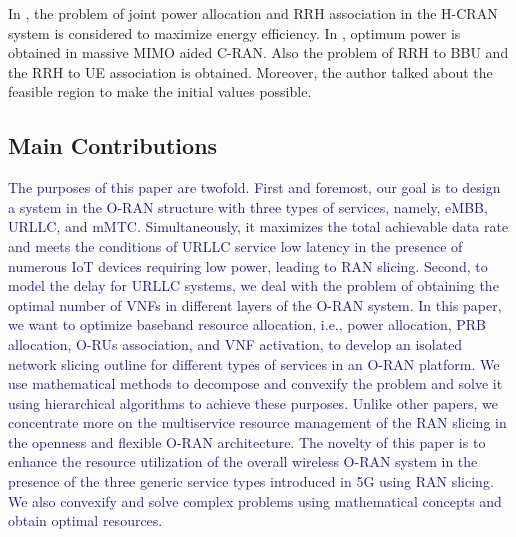 \documentclass[lettersize,journal]{IEEEtran}
\begin{document}
In \cite{ali2019energy,ali2019energy1,ali2018joint}, the problem of joint power allocation and RRH association in the H-CRAN system is considered to maximize energy efficiency.
In \cite{amani2019power}, optimum power is obtained in massive MIMO aided C-RAN. Also the problem of RRH to BBU and the RRH to UE association is obtained. Moreover, the author talked about the feasible region to make the initial values possible.
\subsection{Main Contributions}
\textcolor{MidnightBlue}{The purposes of this paper are twofold. First and foremost, our goal is to design a system in the O-RAN structure with three types of services, namely, eMBB, URLLC, and mMTC. Simultaneously, it maximizes the total achievable data rate and meets the conditions of URLLC service low latency in the presence of numerous IoT devices requiring low power, leading to RAN slicing. Second, to model the delay for URLLC systems, we deal with the problem of obtaining the optimal number of VNFs in different layers of the O-RAN system. 
In this paper, we want to optimize baseband resource allocation, i.e., power allocation, PRB allocation, O-RUs association, and VNF activation, to develop an isolated network slicing outline for different types of services in an O-RAN platform. 
We use mathematical methods to decompose and convexify the problem and solve it using hierarchical algorithms to achieve these purposes.
Unlike other papers, we concentrate more on the multiservice resource management of the RAN slicing in the openness and flexible O-RAN architecture.
The novelty of this paper is to enhance the resource utilization of the overall wireless O-RAN system in the presence of the three generic service types introduced in 5G using RAN slicing. We also convexify and solve complex problems using mathematical concepts and obtain optimal resources.}
\end{document}
